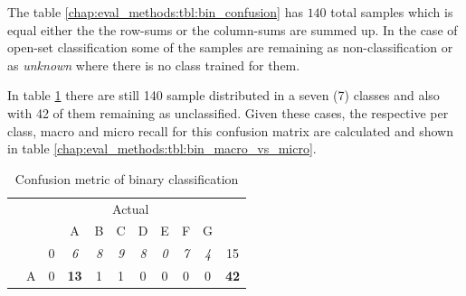 The table \ref{chap:eval_methods:tbl:bin_confusion} has $140$ total samples which is equal either the the row-sums or the column-sums are summed up. In the case of open-set classification some of the samples are remaining as non-classification or as \textit{unknown} where there is no class trained for them. 

In table \ref{chap:eval_methods:tbl:multi_confusion} there are still 140 sample distributed in a seven (7) classes and also with 42 of them remaining as unclassified. Given these cases, the respective per class, macro and micro recall for this confusion matrix are calculated and shown in table \ref{chap:eval_methods:tbl:bin_macro_vs_micro}.

\begin{table}[H]
	\center
	\caption{Confusion metric of binary classification}\label{chap:eval_methods:tbl:multi_confusion}
	\begin{tabular}{c c c c c c c c c c c}
		& & \multicolumn{8}{c}{Actual} & \\
		\cline{3-10}
		\multirow{10}{*}{\rotatebox[origin=c]{90}{Predicted}} & & \multicolumn{1}{|c}{\emptyset} & \multicolumn{1}{c}{A} & \multicolumn{1}{c}{B} & \multicolumn{1}{c}{C} & \multicolumn{1}{c}{D} & \multicolumn{1}{c}{E}  & \multicolumn{1}{c}{F} & \multicolumn{1}{c|}{G} & \\
		\cline{2-10}
		& \multicolumn{1}{|c}{\emptyset} & \multicolumn{1}{|c}{0} & \multicolumn{1}{c}{\textit{6}} & \multicolumn{1}{c}{\textit{8}} & \multicolumn{1}{c}{\textit{9}} & \multicolumn{1}{c}{\textit{8}} & \multicolumn{1}{c}{\textit{0}} & \multicolumn{1}{c}{\textit{7}} & \multicolumn{1}{c|}{\textit{4}} & 15 \\
		& \multicolumn{1}{|c}{A} & \multicolumn{1}{|c}{0} & \multicolumn{1}{c}{\textbf{13}} & \multicolumn{1}{c}{1} & \multicolumn{1}{c}{1} & \multicolumn{1}{c}{0} & \multicolumn{1}{c}{0} & \multicolumn{1}{c}{0} & \multicolumn{1}{c|}{0} & \textbf{42}
		

\end{tabular}
\end{table}
